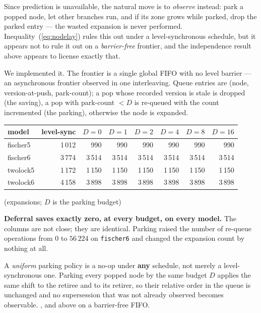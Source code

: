 Since prediction is unavailable, the natural move is to \emph{observe} instead: park a popped node,
let other branches run, and if its zone grows while parked, drop the parked entry --- the wasted
expansion is never performed. Inequality~(\ref{eq:nodelay}) rules this out under a level-synchronous
schedule, but it appears not to rule it out on a \emph{barrier-free} frontier, and the independence
result above appears to license exactly that.

We implemented it. The frontier is a single global FIFO with no level barrier --- an asynchronous
frontier observed in one interleaving. Queue entries are (node, version-at-push, park-count); a pop
whose recorded version is stale is dropped (the saving), a pop with park-count $< D$ is re-queued
with the count incremented (the parking), otherwise the node is expanded.

\begin{center}\small
\begin{tabular}{lrrrrrrr}
\toprule
model & level-sync & $D{=}0$ & $D{=}1$ & $D{=}2$ & $D{=}4$ & $D{=}8$ & $D{=}16$ \\
\midrule
fischer5 & 1\,012 & 990    & 990    & 990    & 990    & 990    & 990 \\
fischer6 & 3\,774 & 3\,514 & 3\,514 & 3\,514 & 3\,514 & 3\,514 & 3\,514 \\
twolock5 & 1\,172 & 1\,150 & 1\,150 & 1\,150 & 1\,150 & 1\,150 & 1\,150 \\
twolock6 & 4\,158 & 3\,898 & 3\,898 & 3\,898 & 3\,898 & 3\,898 & 3\,898 \\
\bottomrule
\end{tabular}
\end{center}
\measured{} (expansions; $D$ is the parking budget)

\textbf{Deferral saves exactly zero, at every budget, on every model.} The columns are not close;
they are identical. Parking raised the number of re-queue operations from $0$ to $56\,224$ on
\texttt{fischer6} and changed the expansion count by nothing at all.

\begin{proposition}
\label{prop:uniform}
A \emph{uniform} parking policy is a no-op under \textbf{any} schedule, not merely a
level-synchronous one. Parking every popped node by the same budget $D$ applies the same shift to
the retiree and to its retirer, so their relative order in the queue is unchanged and no
supersession that was not already observed becomes observable. \proved{}, and \measured{} above on a
barrier-free FIFO.
\end{proposition}

